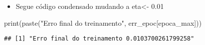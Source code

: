 \documentclass[
]{article}
\newenvironment{Shaded}{\begin{snugshade}}{\end{snugshade}}
\newcommand{\FunctionTok}[1]{\textcolor[rgb]{0.00,0.00,0.00}{#1}}
\newcommand{\NormalTok}[1]{#1}
\newcommand{\StringTok}[1]{\textcolor[rgb]{0.31,0.60,0.02}{#1}}
\providecommand{\tightlist}{%
  \setlength{\itemsep}{0pt}\setlength{\parskip}{0pt}}
\begin{document}
\begin{itemize}
\tightlist
\item
  Segue código condensado mudando a eta\textless- 0.01
\end{itemize}

\begin{Shaded}
\begin{Highlighting}[]
\FunctionTok{print}\NormalTok{(}\FunctionTok{paste}\NormalTok{(}\StringTok{"Erro final do treinamento"}\NormalTok{, err\_epoc[epoca\_max]))}
\end{Highlighting}
\end{Shaded}

\begin{verbatim}
## [1] "Erro final do treinamento 0.0103700261799258"
\end{verbatim}
\end{document}
